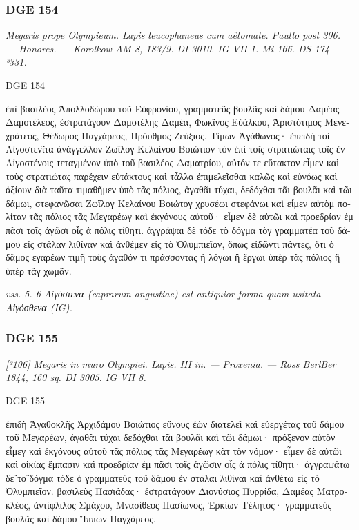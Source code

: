 \hrulefill

\subsubsection{DGE 154}
\textit{Megaris prope Olympieum. Lapis leucophaneus cum aëtomate. Paullo post 306. — Honores. — Korolkow AM 8, 183/9. DI 3010. IG VII 1. Mi 166. DS 174 ³331.}
\begin{versi}{DGE 154}
\begin{greek}
ἐπὶ βασιλέος Ἀπολλοδώρου τοῦ Εὐφρονίου, γραμματεῦς βουλᾶς {\verso[1]} καὶ δάμου Δαμέας Δαμοτέλεος, ἐστρατάγουν Δαμοτέλης {\verso} Δαμέα, Φωκῖνος Εὐάλκου, Ἀριστότιμος Μενεχράτεος, Θέδωρος {\verso} Παγχάρεος, Πρόυθμος Ζεύξιος, Τίμων Ἀγάθωνος· ἐπειδὴ τοὶ Αἰγοστενῖτα ἀνάγγελλον Ζωΐλογ Κελαίνου Βοιώτιον {\verso} τὸν ἐπὶ τοῖς στρατιώταις τοῖς ἐν Αἰγοστένοις τεταγμένον ὑπὸ τοῦ {\verso} βασιλέος Δαματρίου, αὐτόν τε εὔτακτον εἶμεν καὶ τοὺς στρατιώ{\verso}τας παρέχειν εὐτάκτους καὶ τἆλλα ἐπιμελεῖσθαι καλῶς καὶ εὐ{\verso}νόως καὶ ἀξίουν διὰ ταῦτα τιμαθῆμεν ὑπὸ τᾶς πόλιος, ἀγαθᾶι τύχαι, δεδόχθαι τᾶι βουλᾶι καὶ τῶι δάμωι, στεφανῶσαι {\verso} Ζωΐλογ Κελαίνου Βοιώτογ χρυσέωι στεφάνωι καὶ εἶμεν αὐτὸμ πο{\verso}λίταν τᾶς πόλιος τᾶς Μεγαρέωγ καὶ ἐκγόνους αὐτοῦ· εἶμεν δὲ {\verso} αὐτῶι καὶ προεδρίαν ἐμ πᾶσι τοῖς ἀγῶσι οἷς ἁ πόλις τίθητι. ἀγγράψαι δὲ τόδε τὸ δόγμα τὸγ γραμματέα τοῦ δάμου εἰς στάλαν λιθίναν {\verso} καὶ ἀνθέμεν εἰς τὸ Ὀλυμπιεῖον, ὅπως εἰδῶντι πάντες, ὅτι ὁ δᾶμος {\verso} εγαρέων τιμῆ τοὺς ἀγαθόν τι πράσσοντας ἢ λόγωι ἢ ἔργωι {\verso} ὑπὲρ τᾶς πόλιος ἢ ὑπὲρ τᾶγ χωμᾶν.
\end{greek}
\end{versi}
\textit{vss. 5. 6 \textgreek{Αἰγόστενα} (caprarum angustiae) est antiquior forma quam usitata \textgreek{Αἰγόσθενα} (IG).}

\hrulefill

\subsubsection{DGE 155}
\textit{[²106] Megaris in muro Olympiei. Lapis. III in. — Proxenia. — Ross BerlBer 1844, 160 sq. DI 3005. IG VII 8.}
\begin{versi}{DGE 155}
\begin{greek}
ἐπιδὴ Ἀγαθοκλῆς Ἀρχιδάμου {\verso[1]} Βοιώτιος εὔνους ἐὼν διατελεῖ {\verso} καὶ εὐεργέτας τοῦ δάμου τοῦ {\verso} Μεγαρέων, ἀγαθᾶι τύχαι δεδόχθαι τᾶι βουλᾶι καὶ τῶι δάμωι· {\verso} πρόξενον αὐτὸν εἶμεγ καὶ ἐκ{\verso}γόνους αὐτοῦ τᾶς πόλιος τᾶς {\verso} Μεγαρέωγ κὰτ τὸν νόμον· εἶμεν {\verso} δὲ αὐτῶι καὶ οἰκίας ἔμπασιν καὶ προεδρίαν ἐμ πᾶσι τοῖς ἀγῶ{\verso}σιν οἷς ἁ πόλις τίθητι· ἀγγραψά{\verso}τω δ\~{ε} τ\~{ο} δόγμα τόδε ὁ γραμματεὺς τοῦ δάμου ἐν στάλαι λιθί{\verso}ναι καὶ ἀνθέτω εἰς τὸ Ὀλυμπιεῖον. βασιλεὺς Πασιάδας· ἐστρατά{\verso}γουν Διονύσιος Πυρρίδα, Δαμέ{\verso}ας Ματροκλέος, ἀντίφλιλος Σμά{\verso}χου, Μνασίθεος Πασίωνος, Ἑρκίων {\verso} Τέλητος· γραμματεὺς βουλᾶς καὶ δάμου Ἵππων Παγχάρεος.
\end{greek}
\end{versi}

